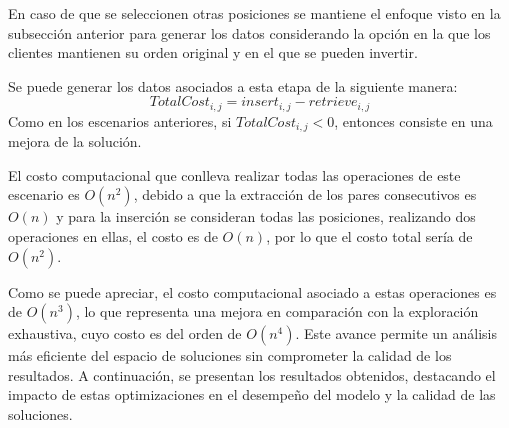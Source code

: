 \documentclass{article}
\begin{document}
En caso de que se seleccionen otras posiciones se mantiene el enfoque visto en la subsección anterior para generar los datos considerando la opción en la que los clientes mantienen su orden original y en el que se pueden invertir.

Se puede generar los datos asociados a esta etapa de la siguiente manera:
\[
TotalCost_{i,j} = insert_{i,j} - retrieve_{i,j} 
 \]
Como en los escenarios anteriores, si $TotalCost_{i,j} < 0$, entonces consiste en una mejora de la solución.

El costo computacional que conlleva realizar todas las operaciones de este escenario es $O(n^2)$, debido a que la extracción de los pares consecutivos es $O(n)$ y para la inserción se consideran todas las posiciones, realizando dos operaciones en ellas, el costo es de $O(n)$, por lo que el costo total sería de $O(n^2)$.

Como se puede apreciar, el costo computacional asociado a estas operaciones es de $O(n^3)$, lo que representa una mejora en comparación con la exploración exhaustiva, cuyo costo es del orden de $O(n^4)$. Este avance permite un análisis más eficiente del espacio de soluciones sin comprometer la calidad de los resultados. A continuación, se presentan los resultados obtenidos, destacando el impacto de estas optimizaciones en el desempeño del modelo y la calidad de las soluciones.
\end{document}
